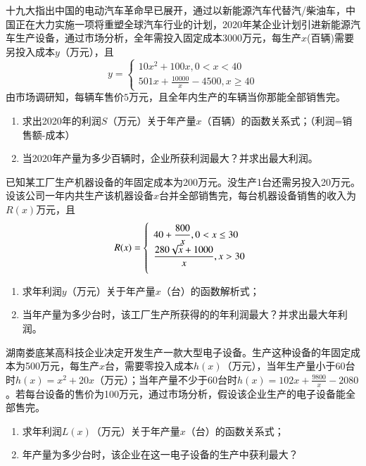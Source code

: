 \newpage
\begin{problemset}
\item 十九大指出中国的电动汽车革命早已展开，通过以新能源汽车代替汽/柴油车，中国正在大力实施一项将重塑全球汽车行业的计划，2020年某企业计划引进新能源汽车生产设备，通过市场分析，全年需投入固定成本3000万元，每生产$x$(百辆)需要另投入成本$y$（万元），且
\begin{equation*}
y = \left \{
	\begin{array}{l}
		10x^2+100x, 0 < x <40\\
		\displaystyle 501x + \frac{10000}{x}-4500, x \geq 40
  \end{array}
  \right .
\end{equation*}
由市场调研知，每辆车售价$5$万元，且全年内生产的车辆当你那能全部销售完。
\begin{enumerate}
	\item 求出2020年的利润$S$（万元）关于年产量$x$（百辆）的函数关系式；（利润=销售额-成本）
	\item 当2020年产量为多少百辆时，企业所获利润最大？并求出最大利润。
\end{enumerate}

\vspace{4mm}
\item 已知某工厂生产机器设备的年固定成本为200万元。没生产1台还需另投入20万元。设该公司一年内共生产该机器设备$x$台并全部销售完，每台机器设备销售的收入为$R(x)$万元，且
\begin{equation*}
	R(x) = \left \{
	\begin{array}{l}
		\displaystyle 40 + \frac{800}{x}, 0 < x \leq 30\\
		\displaystyle \vspace{2mm} \frac{280\sqrt{x}+1000}{x}, x > 30
  \end{array}
  \right .
\end{equation*}
\begin{enumerate}
	\item 求年利润$y$（万元）关于年产量$x$（台）的函数解析式；
	\item 当年产量为多少台时，该工厂生产所获得的的年利润最大？并求出最大年利润。
\end{enumerate}

\vspace{4mm}
\item 湖南娄底某高科技企业决定开发生产一款大型电子设备。生产这种设备的年固定成本为500万元，每生产$x$台，需要零投入成本$h(x)$（万元），当年生产量小于60台时$h(x)=x^2+20x$（万元）；当年产量不少于60台时$\displaystyle h(x)=102x+\frac{9800}{x}-2080$。若每台设备的售价为100万元，通过市场分析，假设该企业生产的电子设备能全部售完。
\begin{enumerate}
	\item 求年利润$L(x)$（万元）关于年产量$x$（台）的函数关系式；
	\item 年产量为多少台时，该企业在这一电子设备的生产中获利最大？
\end{enumerate}
\end{problemset}